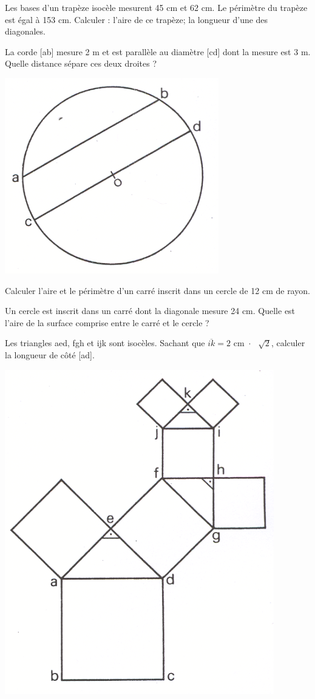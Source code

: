 \begin{exercice}
Les bases d'un trapèze isocèle mesurent 45 cm et 62 cm.
Le périmètre du trapèze est égal à 153 cm. Calculer :
l'aire de ce trapèze;
la longueur d'une des diagonales.

\end{exercice}

\begin{exercice}
La corde [ab] mesure 2 m et est parallèle au diamètre [cd] dont la mesure est 3 m.
Quelle distance sépare ces deux droites ?
\begin{center}
\includegraphics[width = 0.4 \textwidth]{triangle/image/pyth9.png}
\end{center}
\end{exercice}

\begin{exercice}
Calculer l'aire et le périmètre d'un carré inscrit dans un cercle de 12 cm de rayon.

\end{exercice}

\begin{exercice}
Un cercle est inscrit dans un carré dont la diagonale mesure 24 cm.
Quelle est l'aire de la surface comprise entre le carré et le cercle ?

\end{exercice}

\begin{exercice}
Les triangles aed, fgh et ijk sont isocèles.
Sachant que $\overline{ik}=2\text{ cm }\cdot \text{ }\sqrt{\text{2}}$, calculer la longueur de côté [ad].
\begin{center}
\includegraphics[width = 0.4 \textwidth]{triangle/image/pyth12.png}
\end{center}
\end{exercice}

